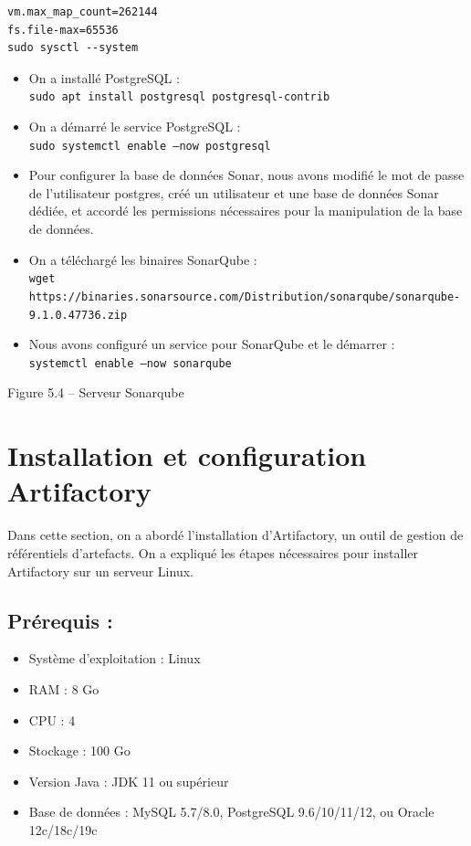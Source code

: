 \begin{verbatim}
vm.max_map_count=262144
fs.file-max=65536
sudo sysctl --system
\end{verbatim}
\begin{itemize}
\item On a installé PostgreSQL : \\
\texttt{sudo apt install postgresql postgresql-contrib}

\item On a démarré le service PostgreSQL : \\
\texttt{sudo systemctl enable --now postgresql}

\item Pour configurer la base de données Sonar, nous avons modifié le mot de passe de l’utilisateur postgres, créé un utilisateur et une base de données Sonar dédiée, et accordé les permissions nécessaires pour la manipulation de la base de données.

\item On a téléchargé les binaires SonarQube : \\
\texttt{wget https://binaries.sonarsource.com/Distribution/sonarqube/sonarqube-9.1.0.47736.zip}

\item Nous avons configuré un service pour SonarQube et le démarrer : \\
\texttt{systemctl enable --now sonarqube}
\end{itemize}

\begin{center}
Figure 5.4 – Serveur Sonarqube
\end{center}

\section*{Installation et configuration Artifactory}

Dans cette section, on a abordé l’installation d’Artifactory, un outil de gestion de référentiels d’artefacts. On a expliqué les étapes nécessaires pour installer Artifactory sur un serveur Linux.

\subsection*{Prérequis :}

\begin{itemize}
\item Système d’exploitation : Linux
\end{itemize}
\begin{itemize}
\item RAM : 8 Go
\item CPU : 4
\item Stockage : 100 Go
\item Version Java : JDK 11 ou supérieur
\item Base de données : MySQL 5.7/8.0, PostgreSQL 9.6/10/11/12, ou Oracle 12c/18c/19c
\end{itemize}

